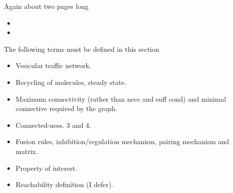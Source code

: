 Again about two pages long

\begin{itemize}
\item {}
\item {}
\end{itemize}

The following terms must be defined in this section

\begin{itemize}
\item Vesicular traffic network.
\item Recycling of molecules, steady state.
\item Maximum connectivity (rather than necc and suff cond) and minimal connective required by the graph. 
\item Connected-ness. 3 and 4.
\item Fusion rules, inhibition/regulation mechanism, pairing mechanism and matrix.
\item Property of interest.
\item Reachability definition (I defer).
\end{itemize}




